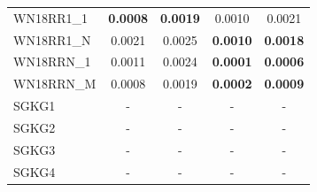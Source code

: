 \begin{table}[t]
{\begin{tabular}{l||cc||cc}
WN18RR1\_1 & \textbf{0.0008} & \textbf{0.0019} & 0.0010 & 0.0021 \\
WN18RR1\_N & 0.0021 & 0.0025 & \textbf{0.0010} & \textbf{0.0018} \\
WN18RRN\_1 & 0.0011 & 0.0024 & \textbf{0.0001} & \textbf{0.0006} \\
WN18RRN\_M & 0.0008 & 0.0019 & \textbf{0.0002} & \textbf{0.0009} \\
\hline
SGKG1 & - & - & - & - \\
SGKG2 & - & - & - & - \\
SGKG3 & - & - & - & - \\
SGKG4 & - & - & - & - \\
\hline
\end{tabular}%
}
\end{table}
